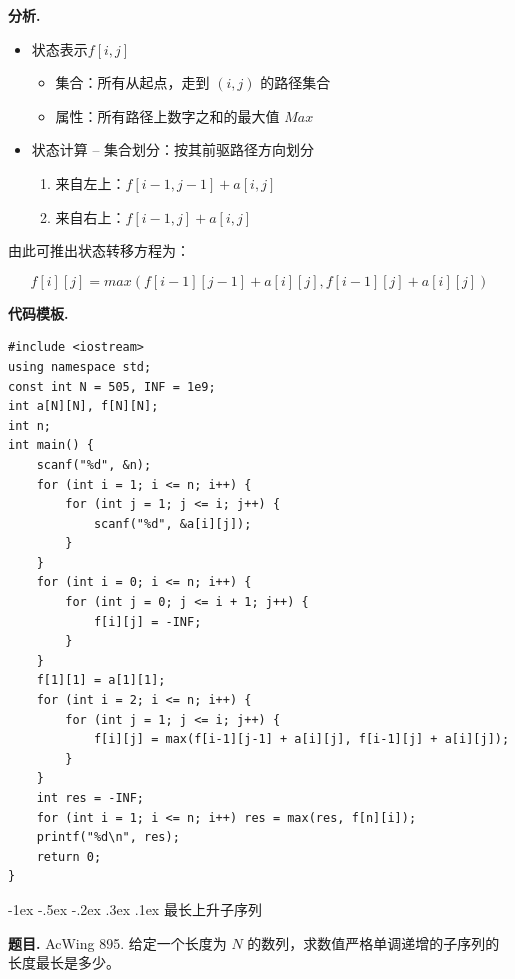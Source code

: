 \documentclass[12pt, a4paper, oneside]{ctexart}
\makeatletter
\newcommand{\xiaosihao}{\fontsize{12pt}{\baselineskip}\selectfont}
\renewcommand\subsubsection{\@startsection{subsubsection}{1}{\z@}%
{-1ex \@plus -.5ex \@minus -.2ex}%
{.3ex \@plus .1ex}%
{\normalfont\xiaosihao\kaishu}}
\newenvironment{problem}{\begin{shaded}\par\noindent\textbf{题目. }}{\end{shaded}\par}
\newenvironment{analysis}{\par\noindent\textbf{分析. }}{\par}
\newenvironment{template}{\par\noindent\textbf{代码模板. }}{\par}
\makeatother
\begin{document}
\begin{analysis}

\begin{itemize}
\item 状态表示$f[i,j]$
\begin{itemize}
\item 集合：所有从起点，走到 $(i,j)$ 的路径集合
\item 属性：所有路径上数字之和的最大值 $Max$
\end{itemize}
\item 状态计算 -- 集合划分：按其前驱路径方向划分
\begin{enumerate}
\item 来自左上：$f[i-1,j-1] + a[i,j]$
\item 来自右上：$f[i-1,j] +a[i,j]$
\end{enumerate}
\end{itemize}

由此可推出状态转移方程为：

\[
f[i][j] = max(f[i-1][j-1] + a[i][j], f[i-1][j] + a[i][j])
\]

\end{analysis}

\begin{template}
\begin{lstlisting}
#include <iostream>
using namespace std;
const int N = 505, INF = 1e9;
int a[N][N], f[N][N];
int n;
int main() {
    scanf("%d", &n);
    for (int i = 1; i <= n; i++) {
        for (int j = 1; j <= i; j++) {
            scanf("%d", &a[i][j]);
        }
    }
    for (int i = 0; i <= n; i++) {
        for (int j = 0; j <= i + 1; j++) {
            f[i][j] = -INF;
        }
    }
    f[1][1] = a[1][1];
    for (int i = 2; i <= n; i++) {
        for (int j = 1; j <= i; j++) {
            f[i][j] = max(f[i-1][j-1] + a[i][j], f[i-1][j] + a[i][j]);
        }
    }
    int res = -INF;
    for (int i = 1; i <= n; i++) res = max(res, f[n][i]);
    printf("%d\n", res);
    return 0;
}
\end{lstlisting}
\end{template}


\subsubsection{最长上升子序列}

\begin{problem}
AcWing 895. 给定一个长度为 $N$ 的数列，求数值严格单调递增的子序列的长度最长是多少。
\end{problem}
\end{document}

